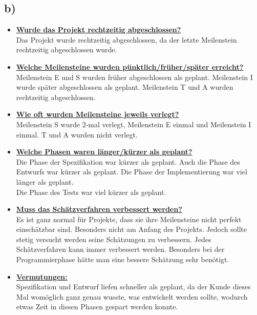 \documentclass[12pt,pdftex,a4paper]{article}
\begin{document}
\subsection*{b)}

\begin{itemize}

\item \textbf{\underline{Wurde das Projekt rechtzeitig abgeschlossen?}}\\
Das Projekt wurde rechtzeitig abgeschlossen, da der letzte Meilenstein rechtzeitig abgeschlossen wurde.

\item \textbf{\underline{Welche Meilensteine wurden pünktlich/früher/später erreicht?}}\\
Meilenstein E und S wurden früher abgeschlossen als geplant. Meilenstein I wurde später abgeschlossen als geplant. Meilenstein T und A wurden rechtzeitig abgeschlossen.

\item \textbf{\underline{Wie oft wurden Meilensteine jeweils verlegt?}}\\
Meilenstein S wurde 2-mal verlegt, Meilenstein E einmal und Meilenstein I einmal. T und A wurden nicht verlegt.

\item \textbf{\underline{Welche Phasen waren länger/kürzer als geplant?}}\\
Die Phase der Spezifikation war kürzer als geplant.  Auch die Phase des Entwurfs war kürzer als geplant. Die Phase der Implementierung war viel länger als geplant.\\
Die Phase des Tests war viel kürzer als geplant.

\newpage
\item \textbf{\underline{Muss das Schätzverfahren verbessert werden?}}\\
Es ist ganz normal für Projekte, dass sie ihre Meilensteine nicht perfekt einschätzbar sind. Besonders nicht am Anfang des Projekts. Jedoch sollte stetig versucht werden seine Schätzungen zu verbessern. Jedes Schätzverfahren kann immer verbessert werden. Besonders bei der Programmierphase hätte man eine bessere Schätzung sehr benötigt.

\item \textbf{\underline{Vermutungen:}}\\
Spezifikation und Entwurf liefen schneller als geplant, da der Kunde dieses Mal womöglich ganz genau wusste, was entwickelt werden sollte, wodurch etwas Zeit in diesen Phasen gespart werden konnte.\\


\end{itemize}
\end{document}
